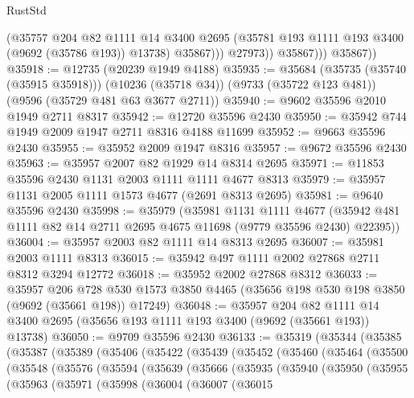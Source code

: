 \begin{lexlean}{RustStd}
\begin{coremodule}
{\begin{coremodule}
{{{{{{{{{{{{{{{{{{{{{{{{{{{{{{{{{{{{{{{{{{{{{{{{{{{{{{{                      (@35757
                        @204
                        @82
                        @1111
                        @14
                        @3400
                        @2695
                        (@35781 @193 @1111 @193 @3400 (@9692 (@35786 @193)) @13738)
                        @35867)))
                  @27973))
              @35867)))
        @35867))
@35918 := @12735 (@20239 @1949 @4188)
@35935 := @35684
    (@35735 (@35740 (@35915 @35918)))
    (@10236 (@35718 @34))
    (@9733 (@35722 @123 @481))
    (@9596 (@35729 @481 @63 @3677 @2711))
@35940 := @9602 @35596 @2010 @1949 @2711 @8317
@35942 := @12720 @35596 @2430
@35950 := @35942 @744 @1949 @2009 @1947 @2711 @8316 @4188 @11699
@35952 := @9663 @35596 @2430
@35955 := @35952 @2009 @1947 @8316
@35957 := @9672 @35596 @2430
@35963 := @35957 @2007 @82 @1929 @14 @8314 @2695
@35971 := @11853 @35596 @2430 @1131 @2003 @1111 @1111 @4677 @8313
@35979 := @35957 @1131 @2005 @1111 @1573 @4677 (@2691 @8313 @2695)
@35981 := @9640 @35596 @2430
@35998 := @35979
    (@35981
      @1131
      @1111
      @4677
      (@35942 @481 @1111 @82 @14 @2711 @2695 @4675 @11698 (@9779 @35596 @2430) @22395))
@36004 := @35957 @2003 @82 @1111 @14 @8313 @2695
@36007 := @35981 @2003 @1111 @8313
@36015 := @35942 @497 @1111 @2002 @27868 @2711 @8312 @3294 @12772
@36018 := @35952 @2002 @27868 @8312
@36033 := @35957
    @206
    @728
    @530
    @1573
    @3850
    @4465
    (@35656 @198 @530 @198 @3850 (@9692 (@35661 @198)) @17249)
@36048 := @35957
    @204
    @82
    @1111
    @14
    @3400
    @2695
    (@35656 @193 @1111 @193 @3400 (@9692 (@35661 @193)) @13738)
@36050 := @9709 @35596 @2430
@36133 := @35319
    (@35344
      (@35385
        (@35387
          (@35389
            (@35406
              (@35422
                (@35439
                  (@35452
                    (@35460
                      (@35464
                        (@35500
                          (@35548
                            (@35576
                              (@35594
                                (@35639
                                  (@35666
                                    (@35935
                                      (@35940
                                        (@35950
                                          (@35955
                                            (@35963
                                              (@35971
                                                (@35998
                                                  (@36004
                                                    (@36007
                                                      (@36015
}}}}}}}}}}}}}}}}}}}}}}}}}}}}}}}}}}}}}}}}}}}}}}}}}}}}}}}
\end{coremodule}}
\end{coremodule}
\end{lexlean}
